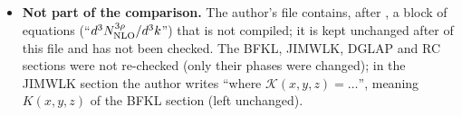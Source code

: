 \begin{itemize}
\item[A8] \textbf{Not part of the comparison.} The author's file contains, after \verb||, a block of equations (``$d^{3}N^{3\rho}_{\rm NLO}/d^{3}k$'') that is not compiled; it is kept unchanged after \verb|| of this file and has not been checked. The BFKL, JIMWLK, DGLAP and RC sections were not re-checked (only their phases were changed); in the JIMWLK section the author writes ``where $\mathcal{K}(x,y,z)=\dots$'', meaning $K(x,y,z)$ of the BFKL section (left unchanged).
\end{itemize}
